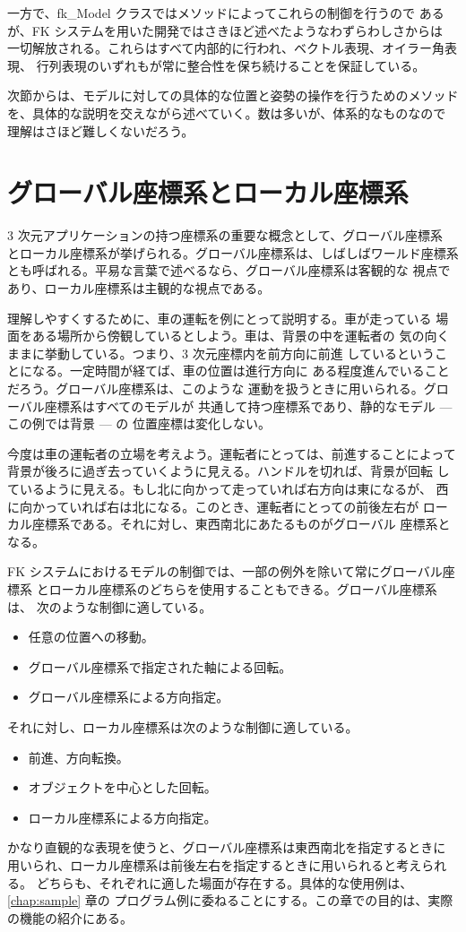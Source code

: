 一方で、fk\_Model クラスではメソッドによってこれらの制御を行うので
あるが、FK システムを用いた開発ではさきほど述べたようなわずらわしさからは
一切解放される。これらはすべて内部的に行われ、ベクトル表現、オイラー角表現、
行列表現のいずれもが常に整合性を保ち続けることを保証している。

次節からは、モデルに対しての具体的な位置と姿勢の操作を行うためのメソッド
を、具体的な説明を交えながら述べていく。数は多いが、体系的なものなので
理解はさほど難しくないだろう。
\section{グローバル座標系とローカル座標系}
3 次元アプリケーションの持つ座標系の重要な概念として、グローバル座標系
とローカル座標系が挙げられる。グローバル座標系は、しばしばワールド座標系
とも呼ばれる。平易な言葉で述べるなら、グローバル座標系は客観的な
視点であり、ローカル座標系は主観的な視点である。

理解しやすくするために、車の運転を例にとって説明する。車が走っている
場面をある場所から傍観しているとしよう。車は、背景の中を運転者の
気の向くままに挙動している。つまり、3 次元座標内を前方向に前進
しているということになる。一定時間が経てば、車の位置は進行方向に
ある程度進んでいることだろう。グローバル座標系は、このような
運動を扱うときに用いられる。グローバル座標系はすべてのモデルが
共通して持つ座標系であり、静的なモデル --- この例では背景 --- の
位置座標は変化しない。

今度は車の運転者の立場を考えよう。運転者にとっては、前進することによって
背景が後ろに過ぎ去っていくように見える。ハンドルを切れば、背景が回転
しているように見える。もし北に向かって走っていれば右方向は東になるが、
西に向かっていれば右は北になる。このとき、運転者にとっての前後左右が
ローカル座標系である。それに対し、東西南北にあたるものがグローバル
座標系となる。

FK システムにおけるモデルの制御では、一部の例外を除いて常にグローバル座標系
とローカル座標系のどちらを使用することもできる。グローバル座標系は、
次のような制御に適している。
\begin{itemize}
 \item 任意の位置への移動。
 \item グローバル座標系で指定された軸による回転。
 \item グローバル座標系による方向指定。
\end{itemize}
それに対し、ローカル座標系は次のような制御に適している。
\begin{itemize}
 \item 前進、方向転換。
 \item オブジェクトを中心とした回転。
 \item ローカル座標系による方向指定。
\end{itemize}
かなり直観的な表現を使うと、グローバル座標系は東西南北を指定するときに
用いられ、ローカル座標系は前後左右を指定するときに用いられると考えられる。
どちらも、それぞれに適した場面が存在する。具体的な使用例は、
\ref{chap:sample} 章の
プログラム例に委ねることにする。この章での目的は、実際の機能の紹介にある。

